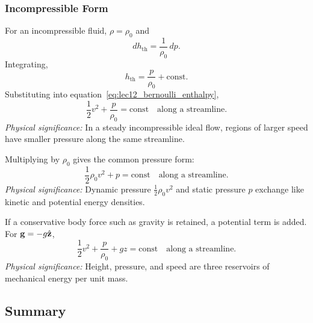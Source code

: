 \documentclass[../main.tex]{subfiles}
\begin{document}
\subsubsection{Incompressible Form}\label{subsec:lec12:bernoulli-incompressible}
For an incompressible fluid, $\rho=\rho_0$ and
\begin{equation}
  dh_{\mathrm{th}}=\frac{1}{\rho_0}\,dp.
  \label{eq:lec12_incompressible_enthalpy_diff}
\end{equation}
Integrating,
\begin{equation}
  h_{\mathrm{th}}=\frac{p}{\rho_0}+\mathrm{const}.
  \label{eq:lec12_incompressible_enthalpy}
\end{equation}
Substituting into equation~\eqref{eq:lec12_bernoulli_enthalpy},
\begin{equation}
  \boxed{
  \frac{1}{2}v^2+\frac{p}{\rho_0}=\mathrm{const}
  \quad\text{along a streamline}.}
  \label{eq:lec12_bernoulli_incompressible}
\end{equation}
\textit{Physical significance:} In a steady incompressible ideal flow, regions of larger speed have smaller pressure along the same streamline.

Multiplying by $\rho_0$ gives the common pressure form:
\begin{equation}
  \boxed{
  \frac{1}{2}\rho_0 v^2+p=\mathrm{const}
  \quad\text{along a streamline}.}
  \label{eq:lec12_bernoulli_pressure_form}
\end{equation}
\textit{Physical significance:} Dynamic pressure $\frac{1}{2}\rho_0v^2$ and static pressure $p$ exchange like kinetic and potential energy densities.

If a conservative body force such as gravity is retained, a potential term is added. For $\mathbf{g}=-g\hat{\mathbf{z}}$,
\begin{equation}
  \boxed{
  \frac{1}{2}v^2+\frac{p}{\rho_0}+gz=\mathrm{const}
  \quad\text{along a streamline}.}
  \label{eq:lec12_bernoulli_with_gravity}
\end{equation}
\textit{Physical significance:} Height, pressure, and speed are three reservoirs of mechanical energy per unit mass.

\subsection{Summary}\label{sec:lec12:summary}
\end{document}
